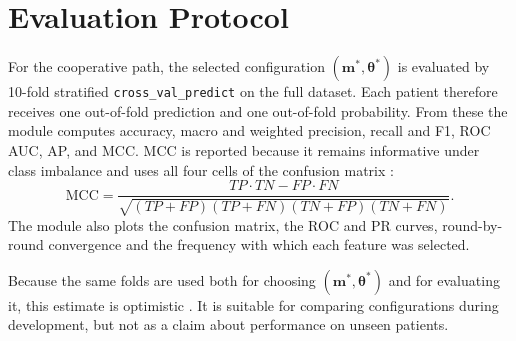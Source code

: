 \documentclass[MTech]{ugthesis}
\begin{document}
\section{Evaluation Protocol}
For the cooperative path, the selected configuration $(\mathbf{m}^{*},\boldsymbol{\theta}^{*})$ is evaluated by 10-fold stratified \texttt{cross\_val\_predict} on the full dataset. Each patient therefore receives one out-of-fold prediction and one out-of-fold probability. From these the module computes accuracy, macro and weighted precision, recall and F1, ROC \ac{AUC}, \ac{AP}, and \ac{MCC}. MCC is reported because it remains informative under class imbalance and uses all four cells of the confusion matrix \citep{chicco2020mcc}:
\begin{equation}
\mathrm{MCC} = \frac{TP\cdot TN - FP\cdot FN}{\sqrt{(TP+FP)(TP+FN)(TN+FP)(TN+FN)}}.
\end{equation}
The module also plots the confusion matrix, the ROC and PR curves, round-by-round convergence and the frequency with which each feature was selected.

Because the same folds are used both for choosing $(\mathbf{m}^{*},\boldsymbol{\theta}^{*})$ and for evaluating it, this estimate is optimistic \citep{varma2006bias,cawley2010overfitting}. It is suitable for comparing configurations during development, but not as a claim about performance on unseen patients.
\end{document}
